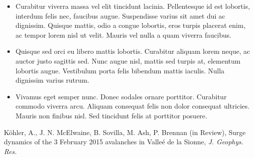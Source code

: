 \documentclass[unknownkeysallowed,usepdftitle=false, parskip=full]{beamer}
\newcommand{\secvariable}{nothing}
\newcommand{\mysection}[1]{\renewcommand{\secvariable}{#1}
}
\begin{document}
\mysection{conclusion}
\begin{frame}\label{\secvariable}
  
  \begin{itemize}
   \item Curabitur viverra massa vel elit tincidunt lacinia. Pellentesque id est lobortis, interdum felis nec, faucibus augue. Suspendisse varius sit amet dui ac dignissim. Quisque mattis, odio a congue lobortis, eros turpis placerat enim, ac tempor lorem nisl ut velit. Mauris vel nulla a quam viverra faucibus. 
  \item Quisque sed orci eu libero mattis lobortis. Curabitur aliquam lorem neque, ac auctor justo sagittis sed. Nunc augue nisl, mattis sed turpis at, elementum lobortis augue. Vestibulum porta felis bibendum mattis iaculis. Nulla dignissim varius rutrum.
  \item Vivamus eget semper nunc. Donec sodales ornare porttitor. Curabitur commodo viverra arcu. Aliquam consequat felis non dolor consequat ultricies. Mauris non finibus nisl. Sed tincidunt felis at porttitor posuere.

  \end{itemize}

  K\"ohler, A., J. N. McElwaine, B. Sovilla, M. Ash, P. Brennan (in Review),
Surge dynamics of the 3 February 2015 avalanches in Valle\'e de la Sionne,
\textit{J. Geophys. Res.} 
  
\end{frame}
\end{document}
